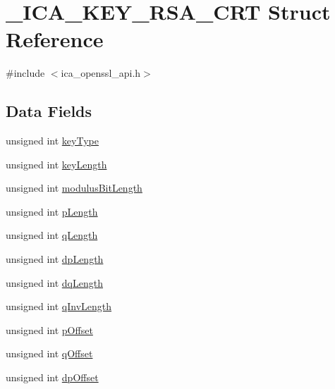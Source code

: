 \hypertarget{struct___i_c_a___k_e_y___r_s_a___c_r_t}{}\section{\+\_\+\+I\+C\+A\+\_\+\+K\+E\+Y\+\_\+\+R\+S\+A\+\_\+\+C\+RT Struct Reference}
\label{struct___i_c_a___k_e_y___r_s_a___c_r_t}


{\ttfamily \#include $<$ica\+\_\+openssl\+\_\+api.\+h$>$}

\subsection*{Data Fields}
\begin{DoxyCompactItemize}
\item 
unsigned int \hyperlink{struct___i_c_a___k_e_y___r_s_a___c_r_t_a95d86e5c4ec0986957452a5988dfed1b}{key\+Type}
\item 
unsigned int \hyperlink{struct___i_c_a___k_e_y___r_s_a___c_r_t_ad5ba5324abb07fb76cd8f114a333a3d0}{key\+Length}
\item 
unsigned int \hyperlink{struct___i_c_a___k_e_y___r_s_a___c_r_t_af71a551186e94efadaed42c8b53a73f6}{modulus\+Bit\+Length}
\item 
unsigned int \hyperlink{struct___i_c_a___k_e_y___r_s_a___c_r_t_ac34f869121a376b838e84463efd83cb0}{p\+Length}
\item 
unsigned int \hyperlink{struct___i_c_a___k_e_y___r_s_a___c_r_t_ab4e9e93c3aea74c6466a4188fed55b85}{q\+Length}
\item 
unsigned int \hyperlink{struct___i_c_a___k_e_y___r_s_a___c_r_t_a507e87f2dbd66861a371d53783512bd8}{dp\+Length}
\item 
unsigned int \hyperlink{struct___i_c_a___k_e_y___r_s_a___c_r_t_a2521263457db1b2580985cb0af454080}{dq\+Length}
\item 
unsigned int \hyperlink{struct___i_c_a___k_e_y___r_s_a___c_r_t_a9ae55e2c9f7640ee0cc76eae3e0450fc}{q\+Inv\+Length}
\item 
unsigned int \hyperlink{struct___i_c_a___k_e_y___r_s_a___c_r_t_a64c3f25fe98caea87a669d5148fd9187}{p\+Offset}
\item 
unsigned int \hyperlink{struct___i_c_a___k_e_y___r_s_a___c_r_t_a27df13ab419ae8a657d9c27e92e7800a}{q\+Offset}
\item 
unsigned int \hyperlink{struct___i_c_a___k_e_y___r_s_a___c_r_t_a875b2e7935cf94353cfaa18da504f94d}{dp\+Offset}

\end{DoxyCompactItemize}
